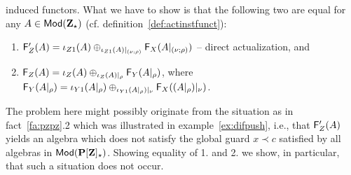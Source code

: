 \begin{PROOF}
induced functors. What we have to show is that the following two are equal
for any $A\in{\sf {Mod}}({\bf Z}_\star)$ (cf. definition~\ref{def:actinstfunct}):
\begin{enumerate}\MyLPar
\item ${\sf {F}}'_Z(A) = \iota_{Z1}(A) \oplus_{\iota_{Z1}(A)|_{(\nu;\rho)}} {\sf {F}}_X(A|_{(\nu;\rho)})$ -- direct actualization, and
\item ${\sf {F}}_Z(A) = \iota_{Z}(A) \oplus_{\iota_{Z}(A)|_{\rho}} {\sf {F}}_Y(A|_{\rho})$, where 
${\sf {F}}_Y(A|_\rho) = \iota_{Y1}(A|_\rho) \oplus_{\iota_{Y1}(A|_\rho)|_{\nu}} {\sf {F}}_X((A|_{\rho})|_\nu)$.
\end{enumerate}
The problem here might possibly originate from the situation as in
fact~\ref{fa:pzpz}.2 which was illustrated in example~\ref{ex:difpush}, i.e.,
that ${\sf {F}}'_Z(A)$ yields an algebra which does not satisfy the global guard
$x\prec c$ satisfied by all algebras in ${\sf {Mod}}({\bf P[Z]_\star})$. Showing
equality of 1. and 2. we show, in particular, that such a situation does not occur.


\end{PROOF}
